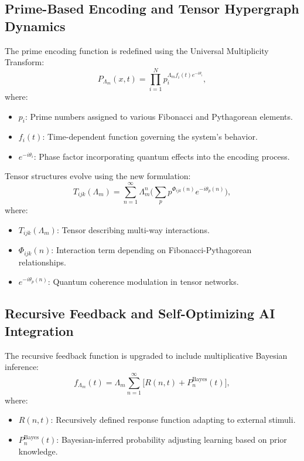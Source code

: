 \documentclass{article}
\theoremstyle{plain}
\begin{document}
\begin{itemize}
\begin{itemize}
\subsection{Prime-Based Encoding and Tensor Hypergraph Dynamics}
The prime encoding function is redefined using the Universal Multiplicity Transform:
\begin{equation}
P_{\Lambda_m}(x, t) = \prod_{i=1}^{N} p_i^{\Lambda_m f_i(t) e^{-i\theta_i}},
\end{equation}
where:
\begin{itemize}
    \item $p_i$: Prime numbers assigned to various Fibonacci and Pythagorean elements.
    \item $f_i(t)$: Time-dependent function governing the system’s behavior.
    \item $e^{-i\theta_i}$: Phase factor incorporating quantum effects into the encoding process.
\end{itemize}

Tensor structures evolve using the new formulation:
\begin{equation}
T_{ijk}(\Lambda_m) = \sum_{n=1}^{\infty} \Lambda_m^n \bigg( \sum_{p} p^{\Phi_{ijk}(n)} e^{-i\theta_p(n)} \bigg),
\end{equation}
where:
\begin{itemize}
    \item $T_{ijk}(\Lambda_m)$: Tensor describing multi-way interactions.
    \item $\Phi_{ijk}(n)$: Interaction term depending on Fibonacci-Pythagorean relationships.
    \item $e^{-i\theta_p(n)}$: Quantum coherence modulation in tensor networks.
\end{itemize}

\subsection{Recursive Feedback and Self-Optimizing AI Integration}
The recursive feedback function is upgraded to include multiplicative Bayesian inference:
\begin{equation}
f_{\Lambda_m}(t) = \Lambda_m \sum_{n=1}^{\infty} \bigg[ R(n, t) + P_n^{\text{Bayes}}(t) \bigg],
\end{equation}
where:
\begin{itemize}
    \item $R(n, t)$: Recursively defined response function adapting to external stimuli.
    \item $P_n^{\text{Bayes}}(t)$: Bayesian-inferred probability adjusting learning based on prior knowledge.
\end{itemize}


\end{itemize}
\end{itemize}
\end{document}
